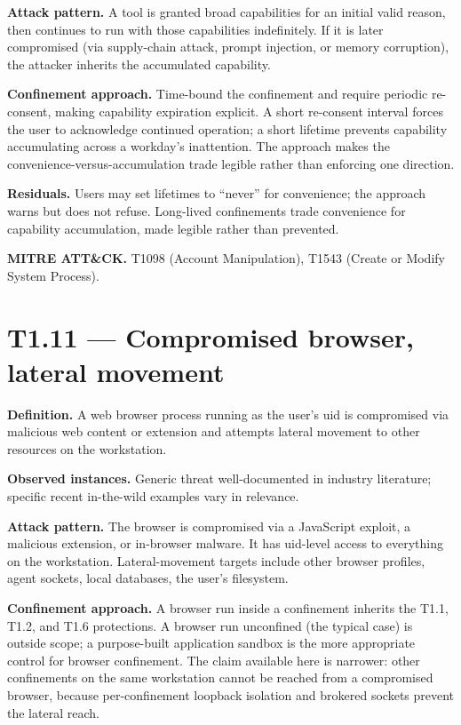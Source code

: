 \textbf{Attack pattern.} A tool is granted broad capabilities for an
initial valid reason, then continues to run with those capabilities
indefinitely. If it is later compromised (via supply-chain attack,
prompt injection, or memory corruption), the attacker inherits the
accumulated capability.

\textbf{Confinement approach.} Time-bound the confinement and require
periodic re-consent, making capability expiration explicit. A short
re-consent interval forces the user to acknowledge continued operation;
a short lifetime prevents capability accumulating across a workday's
inattention. The approach makes the convenience-versus-accumulation
trade legible rather than enforcing one direction.

\textbf{Residuals.} Users may set lifetimes to ``never'' for
convenience; the approach warns but does not refuse. Long-lived
confinements trade convenience for capability accumulation, made legible
rather than prevented.

\textbf{MITRE ATT\&CK.} T1098 (Account Manipulation), T1543 (Create or
Modify System Process).

\hypertarget{t1.11-compromised-browser-lateral-movement}{%
\section{T1.11 --- Compromised browser, lateral
movement}\label{t1.11-compromised-browser-lateral-movement}}

\textbf{Definition.} A web browser process running as the user's uid is
compromised via malicious web content or extension and attempts lateral
movement to other resources on the workstation.

\textbf{Observed instances.} Generic threat well-documented in industry
literature; specific recent in-the-wild examples vary in relevance.

\textbf{Attack pattern.} The browser is compromised via a JavaScript
exploit, a malicious extension, or in-browser malware. It has uid-level
access to everything on the workstation. Lateral-movement targets
include other browser profiles, agent sockets, local databases, the
user's filesystem.

\textbf{Confinement approach.} A browser run inside a confinement
inherits the T1.1, T1.2, and T1.6 protections. A browser run unconfined
(the typical case) is outside scope; a purpose-built application sandbox
is the more appropriate control for browser confinement. The claim
available here is narrower: other confinements on the same workstation
cannot be reached from a compromised browser, because per-confinement
loopback isolation and brokered sockets prevent the lateral reach.

